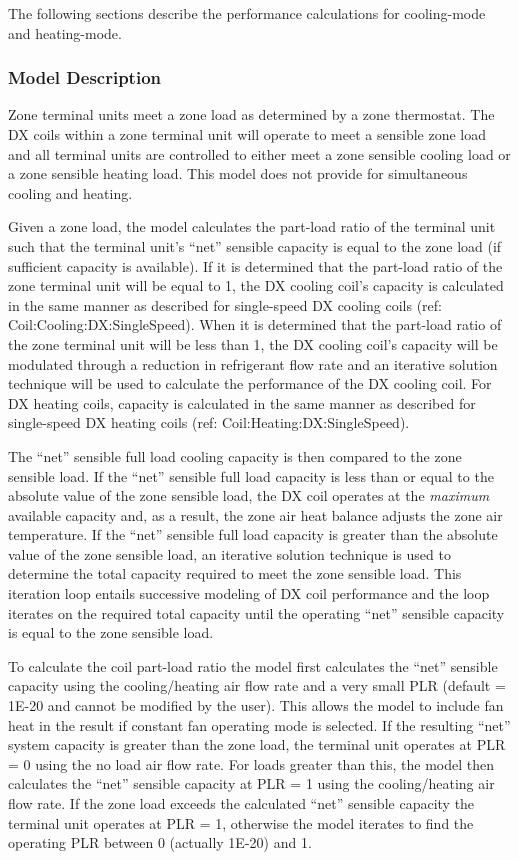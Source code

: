 The following sections describe the performance calculations for cooling-mode and heating-mode.

\subsubsection{Model Description}\label{model-description-4-002}

Zone terminal units meet a zone load as determined by a zone thermostat. The DX coils within a zone terminal unit will operate to meet a sensible zone load and all terminal units are controlled to either meet a zone sensible cooling load or a zone sensible heating load. This model does not provide for simultaneous cooling and heating.

Given a zone load, the model calculates the part-load ratio of the terminal unit such that the terminal unit's ``net'' sensible capacity is equal to the zone load (if sufficient capacity is available). If it is determined that the part-load ratio of the zone terminal unit will be equal to 1, the DX cooling coil's capacity is calculated in the same manner as described for single-speed DX cooling coils (ref: Coil:Cooling:DX:SingleSpeed). When it is determined that the part-load ratio of the zone terminal unit will be less than 1, the DX cooling coil's capacity will be modulated through a reduction in refrigerant flow rate and an iterative solution technique will be used to calculate the performance of the DX cooling coil. For DX heating coils, capacity is calculated in the same manner as described for single-speed DX heating coils (ref: Coil:Heating:DX:SingleSpeed).

The ``net'' sensible full load cooling capacity is then compared to the zone sensible load. If the ``net'' sensible full load capacity is less than or equal to the absolute value of the zone sensible load, the DX coil operates at the \emph{maximum} available capacity and, as a result, the zone air heat balance adjusts the zone air temperature. If the ``net'' sensible full load capacity is greater than the absolute value of the zone sensible load, an iterative solution technique is used to determine the total capacity required to meet the zone sensible load. This iteration loop entails successive modeling of DX coil performance and the loop iterates on the required total capacity until the operating ``net'' sensible capacity is equal to the zone sensible load.

To calculate the coil part-load ratio the model first calculates the ``net'' sensible capacity using the cooling/heating air flow rate and a very small PLR (default = 1E-20 and cannot be modified by the user). This allows the model to include fan heat in the result if constant fan operating mode is selected. If the resulting ``net'' system capacity is greater than the zone load, the terminal unit operates at PLR = 0 using the no load air flow rate. For loads greater than this, the model then calculates the ``net'' sensible capacity at PLR = 1 using the cooling/heating air flow rate. If the zone load exceeds the calculated ``net'' sensible capacity the terminal unit operates at PLR = 1, otherwise the model iterates to find the operating PLR between 0 (actually 1E-20) and 1.

